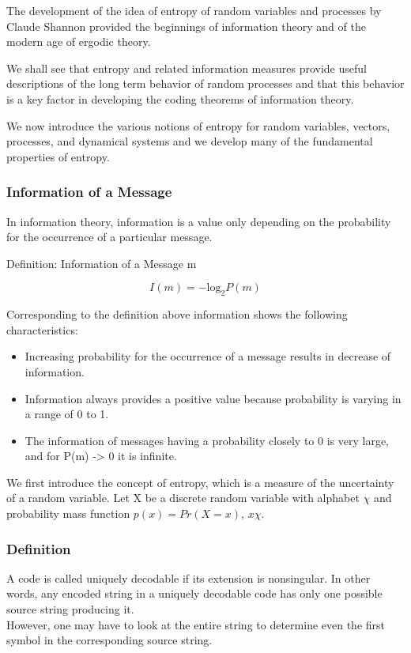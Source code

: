 \documentclass[a4]{beamer}
\begin{document}
\begin{frame}
The development of the idea of entropy of random variables and processes by
Claude Shannon provided the beginnings of information theory and of the modern
age of ergodic theory. 


We shall see that entropy and related information
measures provide useful descriptions of the long term behavior of random processes
and that this behavior is a key factor in developing the coding theorems
of information theory. 


We now introduce the various notions of entropy for random
variables, vectors, processes, and dynamical systems and we develop many
of the fundamental properties of entropy.
\end{frame}

\begin{frame}
\frametitle{Information of a Message}


In information theory, information is a value only depending on the probability for the occurrence of a particular message.



Definition: Information of a Message m


\[   I(m) = - \mbox{log}_2 P(m)\]



Corresponding to the definition above information shows the following characteristics:
\begin{itemize}
\item Increasing probability for the occurrence of a message results in decrease of information. 
\item Information always provides a positive value because probability is varying in a range of 0 to 1. 
\item The information of messages having a probability closely to 0 is very large, and for P(m) -> 0 it is infinite. 
\end{itemize}
\end{frame}



\begin{frame}
We first introduce the concept of entropy, which is a measure of the
uncertainty of a random variable. Let X be a discrete random variable
with alphabet $\chi$ and probability mass function $p(x) = Pr(X = x)$, $x  \chi$.


\end{frame}
\begin{frame}
\frametitle{Definition} A code is called uniquely decodable if its extension is nonsingular.
In other words, any encoded string in a uniquely decodable code has
only one possible source string producing it. 
\\
\bigskip
However, one may have to look at the entire string to determine even the first symbol in the
corresponding source string.


\end{frame}
\end{document}
